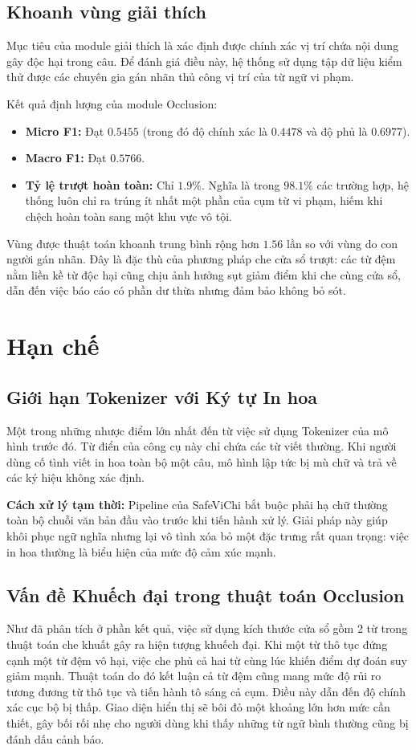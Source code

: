 \documentclass[12pt,a4paper]{article}
\begin{document}
\subsection{Khoanh vùng giải thích}
Mục tiêu của module giải thích là xác định được chính xác vị trí chứa nội dung gây độc hại trong câu. Để đánh giá điều này, hệ thống sử dụng tập dữ liệu kiểm thử được các chuyên gia gán nhãn thủ công vị trí của từ ngữ vi phạm.

Kết quả định lượng của module Occlusion:
\begin{itemize}
    \item \textbf{Micro F1:} Đạt $0.5455$ (trong đó độ chính xác là $0.4478$ và độ phủ là $0.6977$).
    \item \textbf{Macro F1:} Đạt $0.5766$.
    \item \textbf{Tỷ lệ trượt hoàn toàn:} Chỉ $1.9\%$. Nghĩa là trong $98.1\%$ các trường hợp, hệ thống luôn chỉ ra trúng ít nhất một phần của cụm từ vi phạm, hiếm khi chệch hoàn toàn sang một khu vực vô tội.
\end{itemize}
Vùng được thuật toán khoanh trung bình rộng hơn $1.56$ lần so với vùng do con người gán nhãn. Đây là đặc thù của phương pháp che cửa sổ trượt: các từ đệm nằm liền kề từ độc hại cũng chịu ảnh hưởng sụt giảm điểm khi che cùng cửa sổ, dẫn đến việc báo cáo có phần dư thừa nhưng đảm bảo không bỏ sót.

\newpage
\section{Hạn chế}

\subsection{Giới hạn Tokenizer với Ký tự In hoa}
Một trong những nhược điểm lớn nhất đến từ việc sử dụng Tokenizer của mô hình trước đó. Từ điển của công cụ này chỉ chứa các từ viết thường. Khi người dùng cố tình viết in hoa toàn bộ một câu, mô hình lập tức bị mù chữ và trả về các ký hiệu không xác định.

\textbf{Cách xử lý tạm thời:} Pipeline của SafeViChi bắt buộc phải hạ chữ thường toàn bộ chuỗi văn bản đầu vào trước khi tiến hành xử lý. Giải pháp này giúp khôi phục ngữ nghĩa nhưng lại vô tình xóa bỏ một đặc trưng rất quan trọng: việc in hoa thường là biểu hiện của mức độ cảm xúc mạnh.

\subsection{Vấn đề Khuếch đại trong thuật toán Occlusion}
Như đã phân tích ở phần kết quả, việc sử dụng kích thước cửa sổ gồm 2 từ trong thuật toán che khuất gây ra hiện tượng khuếch đại. Khi một từ thô tục đứng cạnh một từ đệm vô hại, việc che phủ cả hai từ cùng lúc khiến điểm dự đoán suy giảm mạnh. Thuật toán do đó kết luận cả từ đệm cũng mang mức độ rủi ro tương đương từ thô tục và tiến hành tô sáng cả cụm.
Điều này dẫn đến độ chính xác cục bộ bị thấp. Giao diện hiển thị sẽ bôi đỏ một khoảng lớn hơn mức cần thiết, gây bối rối nhẹ cho người dùng khi thấy những từ ngữ bình thường cũng bị đánh dấu cảnh báo.
\end{document}
